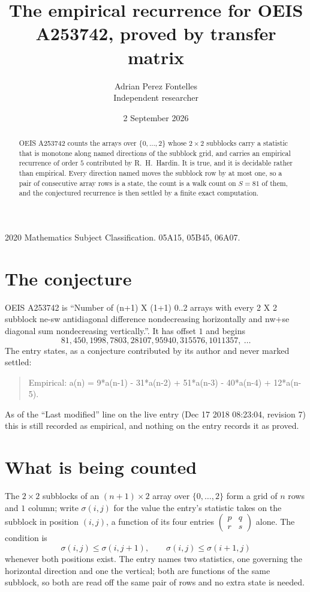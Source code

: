 \documentclass[11pt,a4paper]{article}
\title{The empirical recurrence for OEIS A253742, proved by transfer matrix}
\author{Adrian Perez Fontelles\\ \small Independent researcher}
\date{2 September 2026}
\theoremstyle{plain}
\theoremstyle{definition}
\begin{document}
\maketitle

\begin{abstract}
OEIS A253742 counts the arrays over $\{0,\dots,2\}$ whose $2\times2$ subblocks carry a
statistic that is monotone along named directions of the subblock grid, and carries an
empirical recurrence of order $5$ contributed by R.~H.~Hardin. It is true, and it is
decidable rather than empirical. Every direction named moves the subblock row by at most one,
so a pair of consecutive array rows is a state, the count is a walk count on $S=81$ of them,
and the conjectured recurrence is then settled by a finite exact computation.
\end{abstract}

\noindent\small 2020 Mathematics Subject Classification. 05A15, 05B45, 06A07.\normalsize

\section{The conjecture}

OEIS A253742 is ``Number of (n+1) X (1+1) 0..2 arrays with every 2 X 2 subblock ne-sw antidiagonal difference nondecreasing horizontally and nw+se diagonal sum nondecreasing vertically.''. It has offset $1$ and begins
\[
81, 450, 1998, 7803, 28107, 95940, 315576, 1011357,\ \dots
\]
The entry states, as a conjecture contributed by its author and never marked settled:
\begin{quote}
Empirical: a(n) = 9*a(n-1) - 31*a(n-2) + 51*a(n-3) - 40*a(n-4) + 12*a(n-5).
\end{quote}
As of the ``Last modified'' line on the live entry (Dec 17 2018 08:23:04, revision 7) this is still
recorded as empirical, and nothing on the entry records it as proved.

\section{What is being counted}

The $2\times2$ subblocks of an $(n+1)\times2$ array over $\{0,\dots,2\}$ form a grid
of $n$ rows and $1$ column; write $\sigma(i,j)$ for the value the entry's statistic takes on
the subblock in position $(i,j)$, a function of its four entries
$\begin{pmatrix}p&q\\r&s\end{pmatrix}$ alone. The condition is
\[
\sigma(i,j)\le\sigma(i,j+1),\qquad \sigma(i,j)\le\sigma(i+1,j)
\]
whenever both positions exist. The entry names two statistics, one governing the horizontal direction and one the vertical; both are functions of the same subblock, so both are read off the same pair of rows and no extra state is needed.
\end{document}
